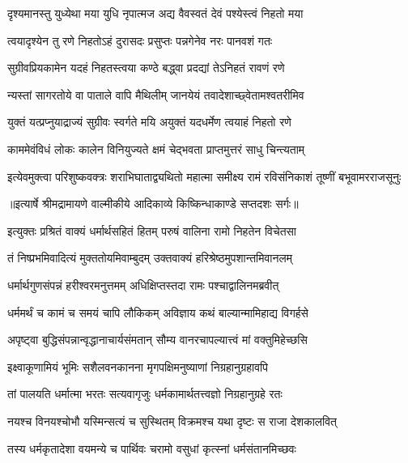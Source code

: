 \twolineshloka
{दृश्यमानस्तु युध्येथा मया युधि नृपात्मज}
{अद्य वैवस्वतं देवं पश्येस्त्वं निहतो मया} %

\twolineshloka
{त्वयादृश्येन तु रणे निहतोऽहं दुरासदः}
{प्रसुप्तः पन्नगेनेव नरः पानवशं गतः} %

\twolineshloka
{सुग्रीवप्रियकामेन यदहं निहतस्त्वया}
{कण्ठे बद्ध्वा प्रदद्यां तेऽनिहतं रावणं रणे} %

\twolineshloka
{न्यस्तां सागरतोये वा पाताले वापि मैथिलीम्}
{जानयेयं तवादेशाच्छ्वेतामश्वतरीमिव} %

\twolineshloka
{युक्तं यत्प्रप्नुयाद्राज्यं सुग्रीवः स्वर्गते मयि}
{अयुक्तं यदधर्मेण त्वयाहं निहतो रणे} %

\twolineshloka
{काममेवंविधं लोकः कालेन विनियुज्यते}
{क्षमं चेद्भवता प्राप्तमुत्तरं साधु चिन्त्यताम्} %

\fourlineindentedshloka
{इत्येवमुक्त्वा परिशुष्कवक्त्रः}
{ शराभिघाताद्व्यथितो महात्मा}
{समीक्ष्य रामं रविसंनिकाशं}
{ तूष्णीं बभूवामरराजसूनुः} %


{॥इत्यार्षे श्रीमद्रामायणे वाल्मीकीये आदिकाव्ये किष्किन्धाकाण्डे सप्तदशः सर्गः॥}


\twolineshloka
{इत्युक्तः प्रश्रितं वाक्यं धर्मार्थसहितं हितम्}
{परुषं वालिना रामो निहतेन विचेतसा} %

\twolineshloka
{तं निष्प्रभमिवादित्यं मुक्ततोयमिवाम्बुदम्}
{उक्तवाक्यं हरिश्रेष्ठमुपशान्तमिवानलम्} %

\twolineshloka
{धर्मार्थगुणसंपन्नं हरीश्वरमनुत्तमम्}
{अधिक्षिप्तस्तदा रामः पश्चाद्वालिनमब्रवीत्} %

\twolineshloka
{धर्ममर्थं च कामं च समयं चापि लौकिकम्}
{अविज्ञाय कथं बाल्यान्मामिहाद्य विगर्हसे} %

\twolineshloka
{अपृष्ट्वा बुद्धिसंपन्नान्वृद्धानाचार्यसंमतान्}
{सौम्य वानरचापल्यात्त्वं मां वक्तुमिहेच्छसि} %

\twolineshloka
{इक्ष्वाकूणामियं भूमिः सशैलवनकानना}
{मृगपक्षिमनुष्याणां निग्रहानुग्रहावपि} %

\twolineshloka
{तां पालयति धर्मात्मा भरतः सत्यवागृजुः}
{धर्मकामार्थतत्त्वज्ञो निग्रहानुग्रहे रतः} %

\twolineshloka
{नयश्च विनयश्चोभौ यस्मिन्सत्यं च सुस्थितम्}
{विक्रमश्च यथा दृष्टः स राजा देशकालवित्} %

\twolineshloka
{तस्य धर्मकृतादेशा वयमन्ये च पार्थिवः}
{चरामो वसुधां कृत्स्नां धर्मसंतानमिच्छवः} %

